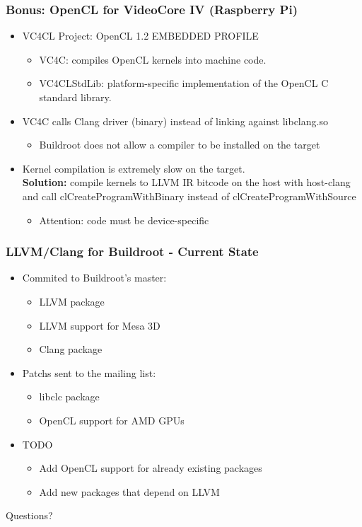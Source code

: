 \documentclass{smilebeamer}
\begin{document}
\begin{frame}
\frametitle{Bonus: OpenCL for VideoCore IV (Raspberry Pi)}
\begin{itemize}
  \item VC4CL Project: OpenCL 1.2 EMBEDDED PROFILE
  \begin{itemize}
    \item VC4C: compiles OpenCL kernels into machine code.
    \item VC4CLStdLib: platform-specific implementation of the OpenCL C standard
    library.
  \end{itemize}
  \item VC4C calls Clang driver (binary) instead of linking against libclang.so
  \begin{itemize}
    \item Buildroot does not allow a compiler to be installed on the target
  \end{itemize}
  \item Kernel compilation is extremely slow on the target.\\
  \textbf{Solution:} compile kernels to LLVM IR bitcode on the host with host-clang and
  call {\selectfont clCreateProgramWithBinary} instead of
  {\selectfont clCreateProgramWithSource}
  \begin{itemize}
    \item Attention: code must be device-specific
  \end{itemize}
\end{itemize}
\end{frame}

\begin{frame}
\frametitle{LLVM/Clang for Buildroot - Current State}
\begin{itemize}
  \item Commited to Buildroot's master:
  \begin{itemize}
    \item LLVM package \checkmark
    \item LLVM support for Mesa 3D \checkmark
    \item Clang package \checkmark
  \end{itemize}
  \item Patchs sent to the mailing list:
  \begin{itemize}
    \item libclc package
    \item OpenCL support for AMD GPUs
  \end{itemize}
  \item TODO
  \begin{itemize}
    \item Add OpenCL support for already existing packages
    \item Add new packages that depend on LLVM
  \end{itemize}
\end{itemize}
\end{frame}

\begin{frame}
\Huge{\centerline{Questions?}}
\end{frame}
\end{document}
